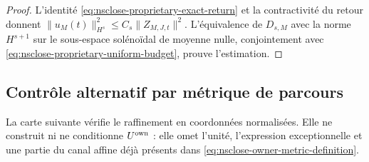 \begin{proof}
L'identité \eqref{eq:nsclose-proprietary-exact-return} et la contractivité du retour donnent \(\|u_M(t)\|_{H^s}^2\le C_s\|Z_{M,J,t}\|^2\). L'équivalence de \(D_{s,M}\) avec la norme \(H^{s+1}\) sur le sous-espace solénoïdal de moyenne nulle, conjointement avec \eqref{eq:nsclose-proprietary-uniform-budget}, prouve l'estimation.
\end{proof}

\subsection{Contrôle alternatif par métrique de parcours}

La carte suivante vérifie le raffinement en coordonnées normalisées. Elle ne construit ni ne conditionne \(U^{\rm own}\) : elle omet l'unité, l'expression exceptionnelle et une partie du canal affine déjà présents dans \eqref{eq:nsclose-owner-metric-definition}.

